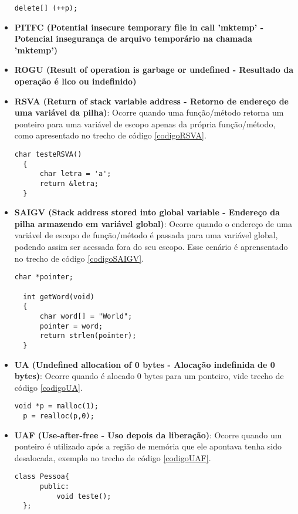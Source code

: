 \begin{itemize}
\begin{lstlisting}[caption={Código exemplo OSF}, label=codigoOSF]
  delete[] (++p);
    \end{lstlisting}
  \item \textbf{PITFC (Potential insecure temporary file in call 'mktemp' - Potencial insegurança de arquivo temporário na
    chamada 'mktemp')}
  \item \textbf{ROGU (Result of operation is garbage or undefined - Resultado da operação é lico ou indefinido)}
  \item \textbf{RSVA (Return of stack variable address - Retorno de endereço de uma variável da pilha)}: Ocorre quando uma
    função/método retorna um ponteiro para uma variável de escopo apenas da própria função/método, como apresentado no trecho
    de código \ref{codigoRSVA}.

    \begin{lstlisting}[caption={Código exemplo RSVA}, label=codigoRSVA]
  char testeRSVA()
  {
      char letra = 'a';
      return &letra;
  }
    \end{lstlisting}
  \item \textbf{SAIGV (Stack address stored into global variable - Endereço da pilha armazendo em variável global)}: Ocorre
    quando o endereço de uma variável de escopo de função/método é passada para uma variável global, podendo assim ser acessada 
    fora do seu escopo. Esse cenário é aprensentado no trecho de código \ref{codigoSAIGV}.

    \begin{lstlisting}[caption={Código exemplo SAIGV}, label=codigoSAIGV]
  char *pointer;

  int getWord(void)
  {
      char word[] = "World";
      pointer = word;
      return strlen(pointer);
  }
    \end{lstlisting}
  \item \textbf{UA (Undefined allocation of 0 bytes - Alocação indefinida de 0 bytes)}: Ocorre quando é alocado 0 bytes para
    um ponteiro, vide trecho de código \ref{codigoUA}.

    \begin{lstlisting}[caption={Código exemplo UA}, label=codigoUA]
  void *p = malloc(1);
  p = realloc(p,0);
    \end{lstlisting}
  \item \textbf{UAF (Use-after-free - Uso depois da liberação)}: Ocorre quando um ponteiro é utilizado após a região de memória
    que ele apontava tenha sido desalocada, exemplo no trecho de código \ref{codigoUAF}.

    \begin{lstlisting}[caption={Código exemplo UAF}, label=codigoUAF]
  class Pessoa{
      public:
          void teste();
  };


\end{lstlisting}
\end{itemize}
